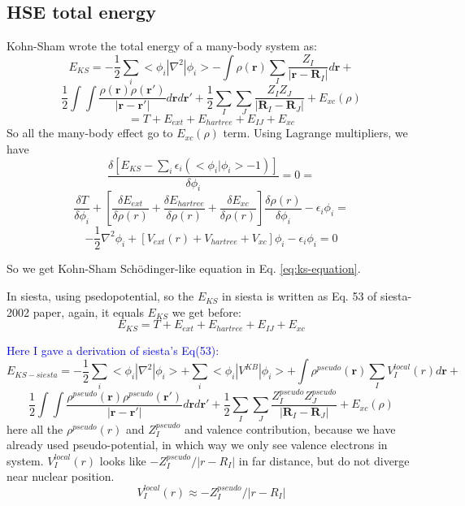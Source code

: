 \documentclass[aps,preprint,12pt]{revtex4-1}
\begin{document}
\subsection{HSE total energy}
Kohn-Sham wrote the total energy of a many-body system as:
\[
E_{KS}=-\dfrac{1}{2}\sum_{i}<\phi_i|\nabla^2|\phi_i>-\int {\rho(\mathbf{r})  \sum_{I}\dfrac{Z_{I}}{|\mathbf{r}-\mathbf{R}_{I}|}  d\mathbf{r}}+
\]
\begin{equation}
 \dfrac{1}{2}\int \int {\dfrac{\rho(\mathbf{r}) \rho(\mathbf{r'}) }{|\mathbf{r}-\mathbf{r'} |}  d\mathbf{r}  d\mathbf{r'}} +\dfrac{1}{2}\sum_{I}\sum_{J}{\dfrac{Z_{I} Z_{J}}{|\mathbf{R}_{I}-\mathbf{R}_{J} |} }+ E_{xc}(\rho)
\label{eq:E_KS}
\end{equation}
\begin{equation}
= T+E_{ext}+E_{hartree}+E_{IJ}+E_{xc}
\end{equation}
So all the many-body effect go to $E_{xc}(\rho)$ term. Using Lagrange multipliers, we have 
\begin{equation}
\dfrac{\delta [E_{KS}-\sum_{i}\epsilon_{i}(<\phi_i|\phi_i> -1)] }
{\delta \phi_i} =  0 =
\end{equation}
\begin{equation}
\dfrac{\delta T}{\delta \phi_i} + 
[\dfrac{\delta E_{ext}}{\delta \rho(r)} + \dfrac{\delta E_{hartree}}{\delta \rho(r)} +  \dfrac{\delta E_{xc}}{\delta \rho(r)} ] 
\dfrac{\delta \rho(r)}{\delta \phi_i}-\epsilon_{i} \phi_i = 
\end{equation}
\begin{equation}
 -\dfrac{1}{2}\nabla^2 \phi_i + 
[V_{ext}(r)+V_{hartree}+V_{xc}] \phi_i -\epsilon_{i} \phi_i = 0
\label{eq:ks-equation}
\end{equation}

So we get Kohn-Sham Sch\"{o}dinger-like equation in Eq. \ref{eq:ks-equation}.

In siesta, using psedopotential, so the $E_{KS}$ in siesta is written as Eq. 53 of siesta-2002 paper, again, it equals $E_{KS}$ we get before:
\begin{equation}
E_{KS}= T + E_{ext}+ E_{hartree} + E_{IJ}+E_{xc} 
\end{equation} 

\textcolor{blue}{Here I gave a derivation of siesta's Eq(53):} 
\[
E_{KS-siesta}=-\dfrac{1}{2}\sum_{i}<\phi_i|\nabla^2|\phi_i> +\sum_{i}<\phi_i|V^{KB}|\phi_i>+\int {\rho^{pseudo}(\mathbf{r})  \sum_{I}V_I^{local}(r)  d\mathbf{r}}+
\]
\begin{equation}
\dfrac{1}{2}\int \int {\dfrac{\rho^{pseudo}(\mathbf{r}) \rho^{pseudo}(\mathbf{r'}) }{|\mathbf{r}-\mathbf{r'} |}  d\mathbf{r}  d\mathbf{r'}} +\dfrac{1}{2}\sum_{I}\sum_{J}{\dfrac{Z^{pseudo}_{I} Z^{pseudo}_{J}}{|\mathbf{R}_{I}-\mathbf{R}_{J} |} }+ E_{xc}(\rho)
\label{eq:E_KS_siesta}
\end{equation}
here all the $\rho^{pseudo}(r)$ and $Z^{pseudo}_I$ and valence contribution, because we have already used pseudo-potential, in which way we only see valence electrons in system. 
$V_I^{local}(r)$ looks like $-Z^{pseudo}_I/|r-R_I|$ in far distance, but do not diverge near nuclear position. 
\begin{equation}
V_I^{local}(r) \approx -Z^{pseudo}_I/|r-R_I|
\end{equation}
\end{document}
